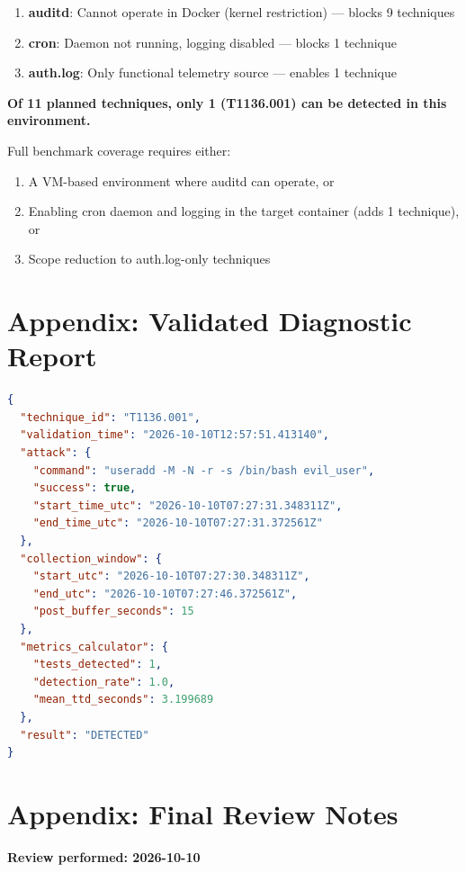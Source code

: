 \documentclass[11pt,a4paper]{article}
\begin{document}
\begin{enumerate}
    \item \textbf{auditd}: Cannot operate in Docker (kernel restriction) --- blocks 9 techniques
    \item \textbf{cron}: Daemon not running, logging disabled --- blocks 1 technique
    \item \textbf{auth.log}: Only functional telemetry source --- enables 1 technique
\end{enumerate}

\textbf{Of 11 planned techniques, only 1 (T1136.001) can be detected in this environment.}

Full benchmark coverage requires either:
\begin{enumerate}
    \item A VM-based environment where auditd can operate, or
    \item Enabling cron daemon and logging in the target container (adds 1 technique), or
    \item Scope reduction to auth.log-only techniques
\end{enumerate}

\section*{Appendix: Validated Diagnostic Report}

\begin{lstlisting}[language=json,caption={validation\_20261010\_125751.json}]
{
  "technique_id": "T1136.001",
  "validation_time": "2026-10-10T12:57:51.413140",
  "attack": {
    "command": "useradd -M -N -r -s /bin/bash evil_user",
    "success": true,
    "start_time_utc": "2026-10-10T07:27:31.348311Z",
    "end_time_utc": "2026-10-10T07:27:31.372561Z"
  },
  "collection_window": {
    "start_utc": "2026-10-10T07:27:30.348311Z",
    "end_utc": "2026-10-10T07:27:46.372561Z",
    "post_buffer_seconds": 15
  },
  "metrics_calculator": {
    "tests_detected": 1,
    "detection_rate": 1.0,
    "mean_ttd_seconds": 3.199689
  },
  "result": "DETECTED"
}
\end{lstlisting}

\section*{Appendix: Final Review Notes}

\textbf{Review performed: 2026-10-10}
\end{document}
